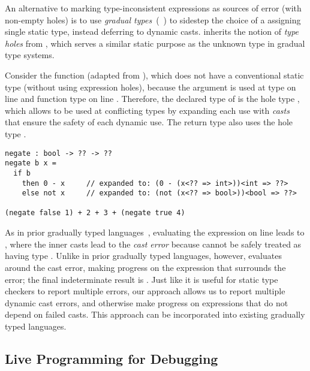 An alternative to marking type-inconsistent expressions as sources of error
(with non-empty holes) is to use \emph{gradual types}~(\eg{}~\cite{XXX,XXX,XXX})
to sidestep the choice of a assigning single static type, instead deferring to
dynamic casts.
%
\HazelnutLive{} inherits the notion of \emph{type holes} from
\citet{popl-paper}, which serves a similar static purpose as the unknown type in
gradual type systems.


Consider the  function (adapted from \cite{ChughPOPL2012}), which
does not have a conventional static type (without using expression holes),
because the argument  is used at type  on line  and
function type on line .
%
Therefore, the declared type of  is the hole type , which allows
 to be used at conflicting types by expanding each use with \emph{casts}
that ensure the safety of each dynamic use.
%
The return type also uses the hole type .

\begin{lstlisting}
negate : bool -> ?? -> ??
negate b x =
  if b
    then 0 - x     // expanded to: (0 - (x<?? => int>))<int => ??>
    else not x     // expanded to: (not (x<?? => bool>))<bool => ??>

(negate false 1) + 2 + 3 + (negate true 4)
\end{lstlisting}

\noindent
%
As in prior gradually typed languages~\cite{XXX},
evaluating the expression  on line  leads to
, where the inner casts
lead to the \emph{cast error}  because  cannot be
safely treated as having type .
%
Unlike in prior gradually typed languages, however, \HazelnutLive{} evaluates
around the cast error, making progress on the 
expression that surrounds the error; the final indeterminate result is
.
%
Just like it is useful for static type checkers to report multiple errors, our
approach allows us to report multiple dynamic cast errors, and otherwise make
progress on expressions that do not depend on failed casts.
%
This approach can be incorporated into existing gradually typed languages.



\subsection{Live Programming for Debugging}

